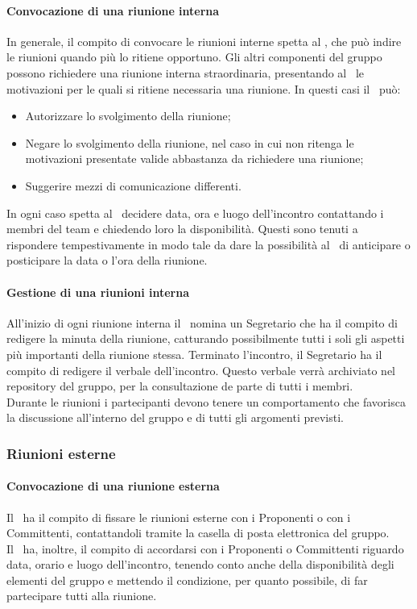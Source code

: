 \documentclass[../NormeProgetto.tex]{subfiles}
\begin{document}
		\paragraph{Convocazione di una riunione interna}
		In generale, il compito di convocare le riunioni interne spetta al \responsabilediprogetto, che può indire le riunioni quando più lo ritiene opportuno. Gli altri componenti del gruppo possono richiedere una riunione interna straordinaria, presentando al \responsabilediprogetto\ le motivazioni per le quali si ritiene necessaria una riunione. In questi casi il \responsabilediprogetto\ può:
		\begin{itemize}
		\item Autorizzare lo svolgimento della riunione;
		\item Negare lo svolgimento della riunione, nel caso in cui non ritenga le motivazioni presentate valide abbastanza da richiedere una riunione;
		\item Suggerire mezzi di comunicazione differenti.
		\end{itemize}
		In ogni caso spetta al \responsabilediprogetto\ decidere data, ora e luogo dell'incontro contattando i membri del team e chiedendo loro la disponibilità. Questi sono tenuti a rispondere tempestivamente in modo tale da dare la possibilità al \responsabilediprogetto\ di anticipare o posticipare la data o l'ora della riunione.
		\paragraph{Gestione di una riunioni interna}
		All'inizio di ogni riunione interna il \responsabilediprogetto\ nomina un Segretario che ha il compito di redigere la minuta della riunione, catturando possibilmente tutti i soli gli aspetti più importanti della riunione stessa. Terminato l'incontro, il Segretario ha il compito di redigere il verbale dell'incontro. Questo verbale verrà archiviato nel repository del gruppo, per la consultazione de parte di tutti i membri. \\ Durante le riunioni i partecipanti devono tenere un comportamento che favorisca la discussione all'interno del gruppo e di tutti gli argomenti previsti. 
		\subsubsection{Riunioni esterne}
		\paragraph{Convocazione di una riunione esterna}
		Il \responsabilediprogetto\ ha il compito di fissare le riunioni esterne con i Proponenti o con i Committenti, contattandoli tramite la casella di posta elettronica del gruppo.\\ Il \responsabilediprogetto\ ha, inoltre, il compito di accordarsi con i Proponenti o Committenti riguardo data, orario e luogo dell'incontro, tenendo conto anche della disponibilità degli elementi del gruppo e mettendo il condizione, per quanto possibile, di far partecipare tutti alla riunione.
\end{document}
